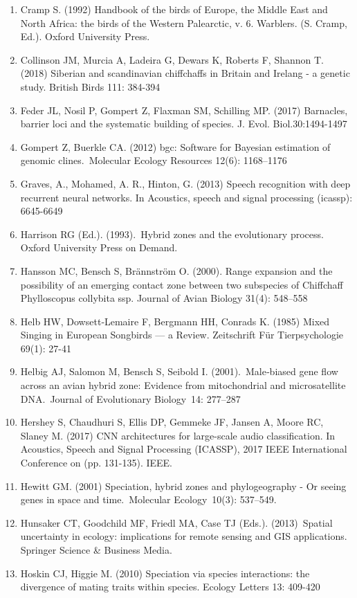 \documentclass[11pt,a4paper]{article}
\begin{document}
\begin{enumerate}
\item Cramp S. (1992) Handbook of the birds of Europe, the Middle East and North Africa: the birds of the Western Palearctic, v. 6. Warblers. (S. Cramp, Ed.). Oxford University Press.
\item Collinson JM, Murcia A, Ladeira G, Dewars K, Roberts F, Shannon T. (2018) Siberian and scandinavian chiffchaffs in Britain and Irelang - a genetic study. British Birds 111: 384-394
\item Feder JL, Nosil P, Gompert Z, Flaxman SM, Schilling MP. (2017) Barnacles, barrier loci and the systematic building of species. J. Evol. Biol.30:1494-1497
\item Gompert Z, Buerkle CA. (2012) bgc: Software for Bayesian estimation of genomic clines. Molecular Ecology Resources 12(6): 1168–1176
\item Graves, A., Mohamed, A. R., Hinton, G. (2013) Speech recognition with deep recurrent neural networks. In Acoustics, speech and signal processing (icassp): 6645-6649
\item Harrison RG (Ed.). (1993). Hybrid zones and the evolutionary process. Oxford University Press on Demand.
\item Hansson MC, Bensch S, Brännström O. (2000). Range expansion and the possibility of an emerging contact zone between two subspecies of Chiffchaff Phylloscopus collybita ssp. Journal of Avian Biology 31(4): 548–558
\item Helb HW, Dowsett‐Lemaire F, Bergmann HH, Conrads K. (1985) Mixed Singing in European Songbirds — a Review. Zeitschrift Für Tierpsychologie 69(1): 27-41
\item Helbig AJ, Salomon M, Bensch S, Seibold I. (2001). Male‐biased gene flow across an avian hybrid zone: Evidence from mitochondrial and microsatellite DNA. Journal of Evolutionary Biology 14: 277–287
\item Hershey S, Chaudhuri S, Ellis DP, Gemmeke JF, Jansen A, Moore RC, Slaney M. (2017) CNN architectures for large-scale audio classification. In Acoustics, Speech and Signal Processing (ICASSP), 2017 IEEE International Conference on (pp. 131-135). IEEE.
\item Hewitt GM. (2001) Speciation, hybrid zones and phylogeography - Or seeing genes in space and time. Molecular Ecology 10(3): 537–549.
\item Hunsaker CT, Goodchild MF, Friedl MA, Case TJ (Eds.). (2013) Spatial uncertainty in ecology: implications for remote sensing and GIS applications. Springer Science \& Business Media.
\item Hoskin CJ, Higgie M. (2010) Speciation via species interactions: the divergence of mating traits within species. Ecology Letters 13: 409-420

\end{enumerate}
\end{document}

